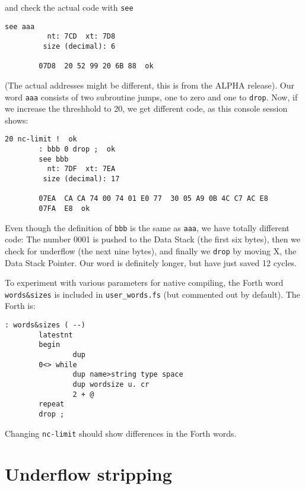 \noindent and check the actual code with \texttt{see}

\begin{lstlisting}[frame=lines]
        see aaa
          nt: 7CD  xt: 7D8
         size (decimal): 6

        07D8  20 52 99 20 6B 88  ok
\end{lstlisting}

\noindent (The actual addresses might be different, this is from the ALPHA release).  Our
word \texttt{aaa} consists of two subroutine jumps, one to zero and one to
\texttt{drop}. Now, if we increase the threshhold to 20, we get different code,
as this console session shows:

\begin{lstlisting}[frame=lines]
        20 nc-limit !  ok
        : bbb 0 drop ;  ok
        see bbb
          nt: 7DF  xt: 7EA
         size (decimal): 17

        07EA  CA CA 74 00 74 01 E0 77  30 05 A9 0B 4C C7 AC E8
        07FA  E8  ok
\end{lstlisting}

\noindent Even though the definition of \texttt{bbb} is the same as \texttt{aaa}, we have
totally different code: The number 0001 is pushed to the Data Stack (the first
six bytes), then we check for underflow (the next nine bytes),
and finally we \texttt{drop} by moving X, the Data Stack
Pointer. Our word is definitely longer, but have just saved 12 cycles.

To experiment with various parameters for native compiling, the Forth word
\texttt{words\&sizes} is included in \texttt{user\_words.fs} (but commented out 
by default). The Forth is:

\begin{lstlisting}[frame=lines]
: words&sizes ( --)
        latestnt
        begin
                dup
        0<> while
                dup name>string type space
                dup wordsize u. cr      
                2 + @
        repeat
        drop ;
\end{lstlisting}

\noindent Changing \texttt{nc-limit} should show differences in the Forth words.



\section{Underflow stripping}

